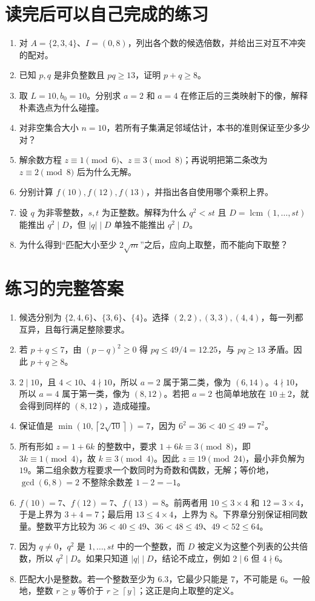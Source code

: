 \documentclass[UTF8,a4paper,oneside,openany,fontset=fandol,zihao=-4]{ctexbook}
\theoremstyle{guide}
\newcommand{\ceil}[1]{\left\lceil#1\right\rceil}
\DeclareMathOperator{\lcm}{lcm}
\begin{document}
\section{读完后可以自己完成的练习}
\begin{enumerate}
\item 对 $A=\{2,3,4\}$、$I=(0,8)$，列出各个数的候选倍数，并给出三对互不冲突的配对。
\item 已知 $p,q$ 是非负整数且 $pq\ge13$，证明 $p+q\ge8$。
\item 取 $L=10,b_0=10$。分别求 $a=2$ 和 $a=4$ 在修正后的三类映射下的像，解释朴素选点为什么碰撞。
\item 对非空集合大小 $n=10$，若所有子集满足邻域估计，本书的准则保证至少多少对？
\item 解余数方程 $z\equiv1\pmod6$、$z\equiv3\pmod8$；再说明把第二条改为 $z\equiv2\pmod8$ 后为什么无解。
\item 分别计算 $f(10),f(12),f(13)$，并指出各自使用哪个乘积上界。
\item 设 $q$ 为非零整数，$s,t$ 为正整数。解释为什么 $q^2<st$ 且 $D=\lcm(1,\ldots,st)$ 能推出 $q^2\mid D$，但 $|q|\mid D$ 单独不能推出 $q^2\mid D$。
\item 为什么得到“匹配大小至少 $2\sqrt m$”之后，应向上取整，而不能向下取整？
\end{enumerate}

\section{练习的完整答案}
\begin{enumerate}
\item 候选分别为 $\{2,4,6\}$、$\{3,6\}$、$\{4\}$。选择 $(2,2),(3,3),(4,4)$，每一列都互异，且每行满足整除要求。
\item 若 $p+q\le7$，由 $(p-q)^2\ge0$ 得 $pq\le49/4=12.25$，与 $pq\ge13$ 矛盾。因此 $p+q\ge8$。
\item $2\mid10$，且 $4<10$、$4\nmid10$，所以 $a=2$ 属于第二类，像为 $(6,14)$。$4\nmid10$，所以 $a=4$ 属于第一类，像为 $(8,12)$。若把 $a=2$ 也简单地放在 $10\pm2$，就会得到同样的 $(8,12)$，造成碰撞。
\item 保证值是 $\min(10,\ceil{2\sqrt{10}})=7$，因为 $6^2=36<40\le49=7^2$。
\item 所有形如 $z=1+6k$ 的整数中，要求 $1+6k\equiv3\pmod8$，即 $3k\equiv1\pmod4$，故 $k\equiv3\pmod4$。因此 $z\equiv19\pmod{24}$，最小非负解为 $19$。第二组余数方程要求一个数同时为奇数和偶数，无解；等价地，$\gcd(6,8)=2$ 不整除余数差 $1-2=-1$。
\item $f(10)=7$、$f(12)=7$、$f(13)=8$。前两者用 $10\le3\times4$ 和 $12=3\times4$，于是上界为 $3+4=7$；最后用 $13\le4\times4$，上界为 $8$。下界章分别保证相同数量。整数平方比较为 $36<40\le49$、$36<48\le49$、$49<52\le64$。
\item 因为 $q\ne0$，$q^2$ 是 $1,\ldots,st$ 中的一个整数，而 $D$ 被定义为这整个列表的公共倍数，所以 $q^2\mid D$。如果只知道 $|q|\mid D$，结论不成立，例如 $2\mid6$ 但 $4\nmid6$。
\item 匹配大小是整数。若一个整数至少为 $6.3$，它最少只能是 $7$，不可能是 $6$。一般地，整数 $r\ge y$ 等价于 $r\ge\ceil y$；这正是向上取整的定义。
\end{enumerate}
\end{document}

